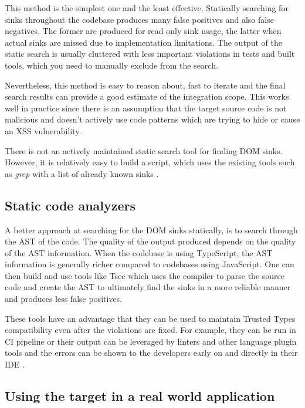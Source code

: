 This method is the simplest one and the least effective. Statically searching for sinks throughout
the codebase produces many false positives and also false negatives. The former are produced for
read only sink usage, the latter when actual sinks are missed due to implementation limitations. The
output of the static search is usually cluttered with less important violations in tests and built
tools, which you need to manually exclude from the search.

Nevertheless, this method is easy to reason about, fast to iterate and the final search results can
provide a good estimate of the integration scope. This works well in practice since there is an
assumption that the target source code is not malicious and doesn't actively use code patterns which
are trying to hide or cause an XSS vulnerability.

There is not an actively maintained static search tool for finding DOM sinks. However, it is
relatively easy to build a script, which uses the existing tools such as \textit{grep} with a list
of already known sinks \cite{xss_sink_finder}.

\subsection{Static code analyzers}

A better approach at searching for the DOM sinks statically, is to search through the AST of the
code. The quality of the output produced depends on the quality of the AST information. When the
codebase is using TypeScript, the AST information is generally richer compared to codebases using
JavaScript. One can then build and use tools like Tsec \cite{tsec_github} which uses the compiler to
parse the source code and create the AST to ultimately find the sinks in a more reliable manner and
produces less false positives.

These tools have an advantage that they can be used to maintain Trusted Types compatibility even
after the violations are fixed. For example, they can be run in CI pipeline or their output can be
leveraged by linters and other language plugin tools and the errors can be shown to the developers
early on and directly in their IDE \cite{tsec_lsp}.

\subsection{Using the target in a real world application}

